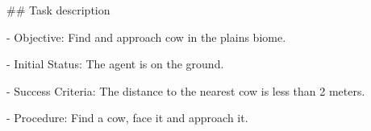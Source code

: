 

\#\# Task description

- Objective: Find and approach cow in the plains biome.

- Initial Status: The agent is on the ground.

- Success Criteria: The distance to the nearest cow is less than 2 meters.

- Procedure: Find a cow, face it and approach it.


